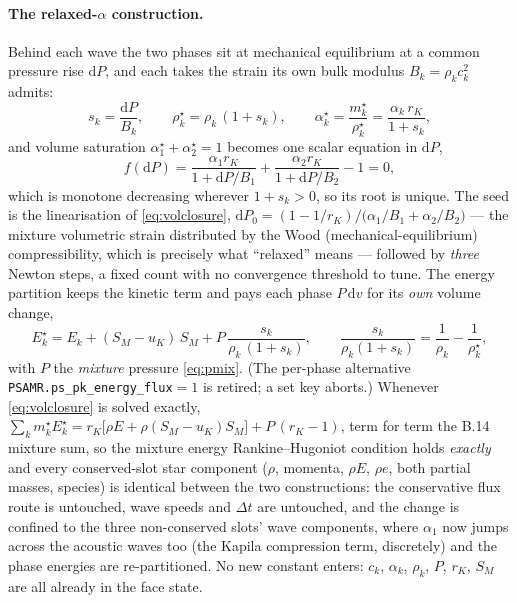 \documentclass[11pt,a4paper]{article}
\newcommand{\code}[1]{\texttt{\small #1}}
\begin{document}
\paragraph{The relaxed-$\alpha$ construction.}
Behind each wave the two phases sit at mechanical equilibrium at a common
pressure rise $\mathrm{d}P$, and each takes the strain its own bulk modulus
$B_k=\rho_kc_k^2$ admits:
\begin{equation}
  s_k = \frac{\mathrm{d}P}{B_k},
  \qquad
  \rho_k^\star = \rho_k\,(1+s_k),
  \qquad
  \alpha_k^\star = \frac{m_k^\star}{\rho_k^\star}
                 = \frac{\alpha_k\,r_K}{1+s_k},
  \label{eq:strain}
\end{equation}
and volume saturation $\alpha_1^\star+\alpha_2^\star=1$ becomes one scalar
equation in $\mathrm{d}P$,
\begin{equation}
  f(\mathrm{d}P)
  = \frac{\alpha_1 r_K}{1+\mathrm{d}P/B_1}
  + \frac{\alpha_2 r_K}{1+\mathrm{d}P/B_2} - 1 = 0 ,
  \label{eq:volclosure}
\end{equation}
which is monotone decreasing wherever $1+s_k>0$, so its root is unique.  The
seed is the linearisation of \eqref{eq:volclosure},
$\mathrm{d}P_0=(1-1/r_K)\big/\bigl(\alpha_1/B_1+\alpha_2/B_2\bigr)$ --- the
mixture volumetric strain distributed by the Wood (mechanical-equilibrium)
compressibility, which is precisely what ``relaxed'' means --- followed by
\emph{three} Newton steps, a fixed count with no convergence threshold to
tune.  The energy partition keeps the kinetic term and pays each phase
$P\,\mathrm{d}v$ for its \emph{own} volume change,
\begin{equation}
  E_k^\star = E_k + (S_M-u_K)\,S_M
            + P\,\frac{s_k}{\rho_k\,(1+s_k)},
  \qquad
  \frac{s_k}{\rho_k(1+s_k)} = \frac{1}{\rho_k}-\frac{1}{\rho_k^\star},
  \label{eq:estar}
\end{equation}
with $P$ the \emph{mixture} pressure \eqref{eq:pmix}.  (The per-phase
alternative \code{PSAMR.ps\_pk\_energy\_flux}$=1$ is retired; a set key
aborts.)  Whenever \eqref{eq:volclosure} is solved exactly,
$\sum_k m_k^\star E_k^\star = r_K\bigl[\rho E+\rho(S_M-u_K)S_M\bigr]+P\,(r_K-1)$,
term for term the B.14 mixture sum, so the mixture energy Rankine--Hugoniot
condition holds \emph{exactly} and every conserved-slot star component
($\rho$, momenta, $\rho E$, $\rho e$, both partial masses, species) is
identical between the two constructions: the conservative flux route is
untouched, wave speeds and $\Delta t$ are untouched, and the change is
confined to the three non-conserved slots' wave components, where $\alpha_1$
now jumps across the acoustic waves too (the Kapila compression term,
discretely) and the phase energies are re-partitioned.  No new constant enters:
$c_k$, $\alpha_k$, $\rho_k$, $P$, $r_K$, $S_M$ are all already in the face
state.
\end{document}
